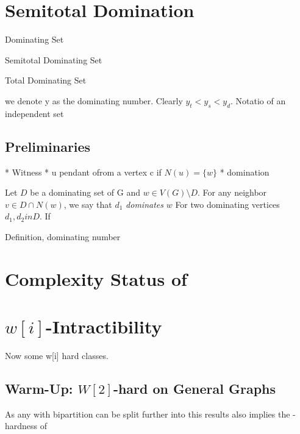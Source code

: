 

\section{Semitotal Domination}


Dominating Set

Semitotal Dominating Set

Total Dominating Set

we denote y as the dominating number. Clearly $y_t < y_s < y_d$.
Notatio of an independent set
\subsection{Preliminaries}

* Witness
* u pendant ofrom a vertex c if $N(u) = \{w\}$
* domination 

Let $D$ be a dominating set of G and $w \in V(G) \setminus D$. For any neighbor $v \in D \cap N(w)$, we say that $d_1$ \textit{dominates} $w$ For two dominating vertices $d_1, d_2in D$. If 

\sdom



Definition, dominating number

\section{Complexity Status of \sdom}

\section{\hmath $w[i]$-Intractibility}

Now some w[i] hard classes. 

\subsection{Warm-Up: \hmath $W[2]$-hard on General Graphs}


As any \bg with bipartition can be split further into \rpg this results also implies the \wone-hardness of \rpg

